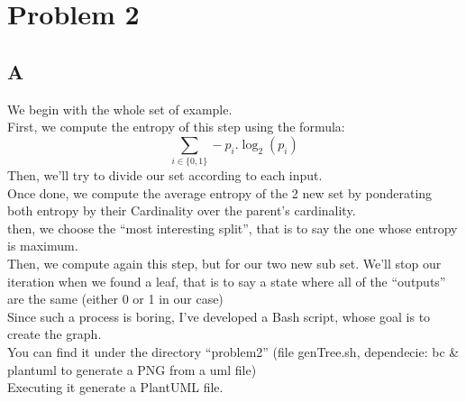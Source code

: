 \documentclass{article}
\begin{document}
    \section{Problem 2}
        \subsection{A}
            We begin with the whole set of example.\\
            First, we compute the entropy of this step using the formula:
            \[
                \sum_{i\in\{0, 1\}} -p_i.\log_2(p_i)
            \]
            Then, we'll try to divide our set according to each input.\\
            Once done, we compute the average entropy of the 2 new set by ponderating both entropy by their Cardinality over the parent's cardinality.\\
            then, we choose the ``most interesting split'', that is to say the one whose entropy is maximum.\\

            Then, we compute again this step, but for our two new sub set. We'll stop our iteration when we found a leaf, that is to say a state where all of the ``outputs'' are the same (either 0 or 1 in our case)\\
            
            Since such a process is boring, I've developed a Bash script, whose goal is to create the graph.\\
            You can find it under the directory ``problem2'' (file genTree.sh, dependecie: bc & plantuml to generate a PNG from a uml file)\\
            Executing it generate a PlantUML file.\\
\end{document}
